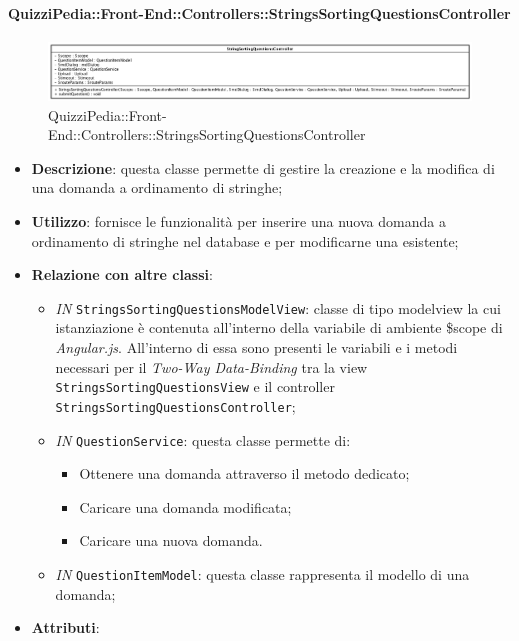 \paragraph{QuizziPedia::Front-End::Controllers::StringsSortingQuestionsController}
\begin{figure} [ht]
	\centering
	\includegraphics[scale=0.45]{UML/Classi/Front-End/QuizziPedia_Front-end_Controller_StringSortingQuestionsController.png}
	\caption{QuizziPedia::Front-End::Controllers::StringsSortingQuestionsController}
\end{figure} \FloatBarrier
\begin{itemize}
	\item \textbf{Descrizione}: questa classe permette di gestire la creazione e la modifica di una domanda a ordinamento di stringhe;
	\item \textbf{Utilizzo}: fornisce le funzionalità per inserire una nuova domanda a ordinamento di stringhe nel database e per modificarne una esistente;
	\item \textbf{Relazione con altre classi}:
	\begin{itemize}
		\item \textit{IN} \texttt{StringsSortingQuestionsModelView}: classe di tipo modelview la cui istanziazione è contenuta all'interno della variabile di ambiente \$scope di \textit{Angular.js}. All'interno di essa sono presenti le variabili e i metodi necessari per il \textit{Two-Way Data-Binding} tra la view \texttt{StringsSortingQuestionsView} e il controller \texttt{StringsSortingQuestionsController};
		\item \textit{IN} \texttt{QuestionService}: questa classe permette di:
		\begin{itemize}
			\item Ottenere una domanda attraverso il metodo dedicato;
			\item Caricare una domanda modificata;
			\item Caricare una nuova domanda.
		\end{itemize}
		\item \textit{IN} \texttt{QuestionItemModel}: questa classe rappresenta il modello di una domanda;
	\end{itemize}
	\item \textbf{Attributi}:
	\begin{itemize}

\end{itemize}
\end{itemize}
